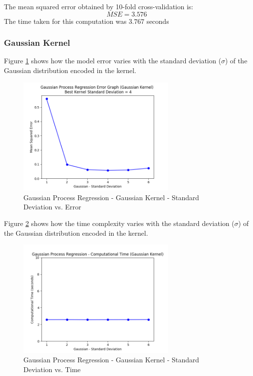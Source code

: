 \documentclass[parskip=full]{scrartcl}
\begin{document}
        The mean squared error obtained by 10-fold cross-validation is:
        $$MSE = 3.576$$
        The time taken for this computation was $3.767$ seconds
        

        \subsubsection*{Gaussian Kernel} %
        \label{ssub:gaussian_kernel}

            Figure \ref{fig:gpr_gaussian_stddev_vs_error} shows how the model error varies with the standard deviation ($\sigma$) of the Gaussian distribution encoded in the kernel.

            \begin{figure}
                \centering
                \includegraphics[width=0.7\textwidth]{3c_gpr_gaussian_stddev_vs_error.png}
                \caption{Gaussian Process Regression - Gaussian Kernel - Standard Deviation vs. Error}
                \label{fig:gpr_gaussian_stddev_vs_error}
            \end{figure}

            Figure \ref{fig:gpr_gaussian_stddev_vs_time} shows how the time complexity varies with the standard deviation ($\sigma$) of the Gaussian distribution encoded in the kernel.

            \begin{figure}
                \centering
                \includegraphics[width=0.7\textwidth]{3c_gpr_gaussian_stddev_vs_time.png}
                \caption{Gaussian Process Regression - Gaussian Kernel - Standard Deviation vs. Time}
                \label{fig:gpr_gaussian_stddev_vs_time}
            \end{figure}
        
\end{document}
